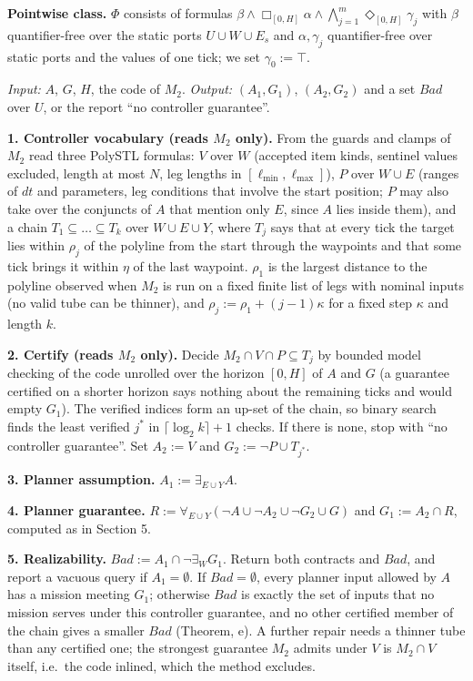 \documentclass[10pt]{article}
\newcommand{\sect}[1]{\par\smallskip{\large\bfseries #1}\par\smallskip}
\newcommand{\ex}{\exists}
\newcommand{\fa}{\forall}
\begin{document}
\textbf{Pointwise class.} $\Phi$ consists of formulas $\beta\wedge\Box_{[0,H]}\alpha\wedge\bigwedge_{j=1}^{m}\Diamond_{[0,H]}\gamma_j$ with $\beta$ quantifier-free over the static ports $U\cup W\cup E_s$ and $\alpha,\gamma_j$ quantifier-free over static ports and the values of one tick; we set $\gamma_0:=\top$.

\sect{2\quad Algorithm}

\emph{Input:} $A$, $G$, $H$, the code of $M_2$. \emph{Output:} $(A_1,G_1)$, $(A_2,G_2)$ and a set $\mathit{Bad}$ over $U$, or the report ``no controller guarantee''.

\textbf{1. Controller vocabulary (reads $M_2$ only).} From the guards and clamps of $M_2$ read three PolySTL formulas: $V$ over $W$ (accepted item kinds, sentinel values excluded, length at most $N$, leg lengths in $[\ell_{\min},\ell_{\max}]$), $P$ over $W\cup E$ (ranges of $dt$ and parameters, leg conditions that involve the start position; $P$ may also take over the conjuncts of $A$ that mention only $E$, since $A$ lies inside them), and a chain $T_1\subseteq\dots\subseteq T_k$ over $W\cup E\cup Y$, where $T_j$ says that at every tick the target lies within $\rho_j$ of the polyline from the start through the waypoints and that some tick brings it within $\eta$ of the last waypoint. $\rho_1$ is the largest distance to the polyline observed when $M_2$ is run on a fixed finite list of legs with nominal inputs (no valid tube can be thinner), and $\rho_j:=\rho_1+(j-1)\kappa$ for a fixed step $\kappa$ and length $k$.

\textbf{2. Certify (reads $M_2$ only).} Decide $M_2\cap V\cap P\subseteq T_j$ by bounded model checking of the code unrolled over the horizon $[0,H]$ of $A$ and $G$ (a guarantee certified on a shorter horizon says nothing about the remaining ticks and would empty $G_1$). The verified indices form an up-set of the chain, so binary search finds the least verified $j^*$ in $\lceil\log_2 k\rceil+1$ checks. If there is none, stop with ``no controller guarantee''. Set $A_2:=V$ and $G_2:=\lnot P\cup T_{j^*}$.

\textbf{3. Planner assumption.} $A_1:=\ex_{E\cup Y}A$.

\textbf{4. Planner guarantee.} $R:=\fa_{E\cup Y}(\lnot A\cup\lnot A_2\cup\lnot G_2\cup G)$ and $G_1:=A_2\cap R$, computed as in Section 5.

\textbf{5. Realizability.} $\mathit{Bad}:=A_1\cap\lnot\ex_W G_1$. Return both contracts and $\mathit{Bad}$, and report a vacuous query if $A_1=\emptyset$. If $\mathit{Bad}=\emptyset$, every planner input allowed by $A$ has a mission meeting $G_1$; otherwise $\mathit{Bad}$ is exactly the set of inputs that no mission serves under this controller guarantee, and no other certified member of the chain gives a smaller $\mathit{Bad}$ (Theorem, e). A further repair needs a thinner tube than any certified one; the strongest guarantee $M_2$ admits under $V$ is $M_2\cap V$ itself, i.e.\ the code inlined, which the method excludes.
\end{document}
